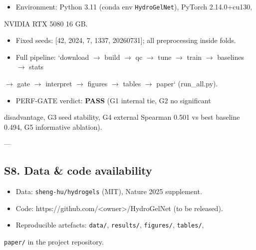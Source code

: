 \documentclass[utf8]{frontiers_suppmat}
\begin{document}
\begin{itemize}
\item Environment: Python 3.11 (conda env \texttt{HydroGelNet}), PyTorch 2.14.0+cu130,
\end{itemize}
  NVIDIA RTX 5080 16 GB.
\begin{itemize}
\item Fixed seeds: [42, 2024, 7, 1337, 20260731]; all preprocessing inside folds.
\item Full pipeline: `download $\rightarrow$ build $\rightarrow$ qc $\rightarrow$ tune $\rightarrow$ train $\rightarrow$ baselines $\rightarrow$ stats
\end{itemize}
  $\rightarrow$ gate $\rightarrow$ interpret $\rightarrow$ figures $\rightarrow$ tables $\rightarrow$ paper` (run_all.py).
\begin{itemize}
\item PERF-GATE verdict: \textbf{PASS} (G1 internal tie, G2 no significant
\end{itemize}
  disadvantage, G3 seed stability, G4 external Spearman 0.501 vs best
  baseline 0.494, G5 informative ablation).

---

\subsection{S8. Data & code availability}

\begin{itemize}
\item Data: \texttt{sheng-hu/hydrogels} (MIT), Nature 2025 supplement.
\item Code: https://github.com/<owner>/HydroGelNet (to be released).
\item Reproducible artefacts: \texttt{data/}, \texttt{results/}, \texttt{figures/}, \texttt{tables/},
\end{itemize}
  \texttt{paper/} in the project repository.
\end{document}
